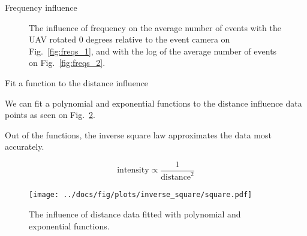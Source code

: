 \documentclass{beamer}
\newcommand{\reffig}[1]{Fig.~\ref{#1}}
\begin{document}
	\begin{frame}{Frequency influence}

		\begin{figure}
			\caption{
		  The influence of frequency on the average number of events with the UAV rotated 0 degrees relative to the event camera on \reffig{fig:freqs_1}, and with the log of the average number of events on \reffig{fig:freqs_2}.
		  }
			\label{fig:freqs}
		\end{figure}
	\end{frame}

	\begin{frame}[allowframebreaks]{Fit a function to the distance influence}

		We can fit a polynomial and exponential functions to the distance influence data points as seen on \reffig{fig:fit1}.

		Out of the functions, the inverse square law approximates the data most accurately.

		\begin{equation}
			\text{intensity} \propto \frac{1}{\text{distance}^2}
		\end{equation}

		\begin{figure}
			\centering
			\texttt{[image: ../docs/fig/plots/inverse\_square/square.pdf]}
			\caption{The influence of distance data fitted with polynomial and exponential functions.}
			\label{fig:fit1}
		\end{figure}

	\end{frame}
\end{document}
